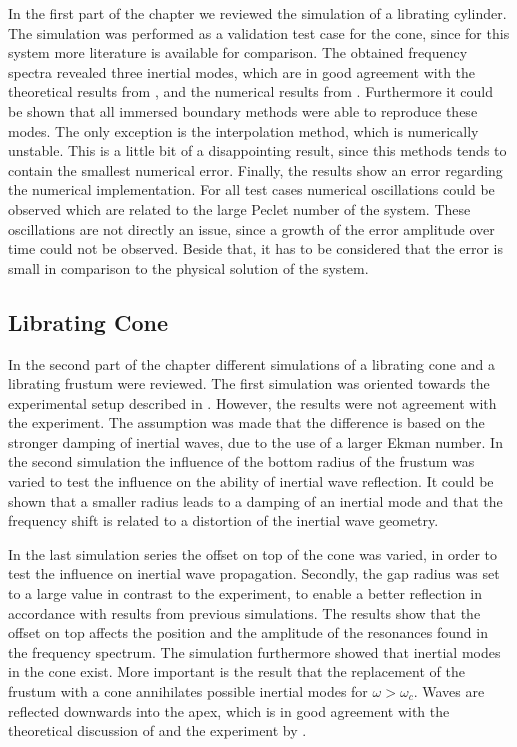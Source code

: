 In the first part of the chapter we reviewed the simulation of a librating cylinder.
The simulation was performed as a validation test case for the cone,
since for this system more literature is available for comparison.
The obtained frequency spectra revealed three inertial modes,
which are in good agreement with the theoretical results from \citep{Greenspan1990},  and the  numerical results from \citep{Sauret2012}.
Furthermore it could be shown that all immersed boundary methods were able to reproduce these modes.
The only exception is the interpolation method, which is numerically unstable.
This is a little bit of a disappointing result, since this methods tends to contain
the smallest numerical error.
Finally, the results show an error regarding the numerical implementation.
For all test cases numerical oscillations could be observed which are related to the
large Peclet number of the system.
These oscillations are not directly an issue, since a growth of the error amplitude over time could not be observed.
Beside that, it has to be considered that the error is small in comparison to the physical solution of the system.

\subsection{Librating Cone}

In the second part of the chapter different simulations of
a librating cone and a librating frustum were reviewed.
The first simulation was oriented towards the experimental setup described in \citep{Beardsley1970}.
However, the results  were not agreement with the experiment.
The assumption was made that the difference is based on the  stronger damping of inertial waves,
due to the use of a larger Ekman number.
In the second simulation the influence of the bottom radius of the frustum was varied
to test the influence on the ability of inertial wave reflection.
It could be shown that a smaller radius leads to a damping of an inertial mode and that the frequency
shift is related to a distortion of the inertial wave geometry.

In the last simulation series  the offset on top of the cone was varied, in order to test the influence on
inertial wave propagation. Secondly, the gap radius was set to a large value in contrast to the experiment,
to enable a better reflection in accordance with results from previous simulations.
The results  show that the offset on top affects the position and the amplitude of the resonances
found in the frequency spectrum.
The simulation furthermore showed that inertial modes in the cone exist.
More important is the result that the replacement of the frustum with a cone annihilates possible
inertial modes for $\omega > \omega_c$.
Waves are reflected downwards into the apex, which is in good agreement with the
theoretical discussion of \citep{Greenspan1969} and the experiment by \citep{Beardsley1970}.

